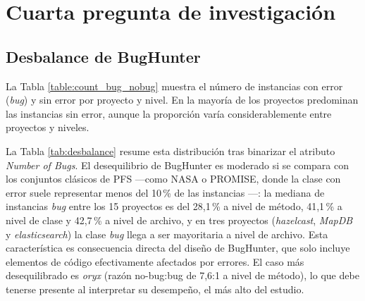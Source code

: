 \section{Cuarta pregunta de investigación}
\label{sec:RQ4}

\noindent{}
\vspace{12pt}

\subsection{Desbalance de BugHunter}

La Tabla \ref{table:count_bug_nobug} muestra el número de instancias con error (\textit{bug}) y sin error por proyecto y nivel. En la mayoría de los proyectos predominan las instancias sin error, aunque la proporción varía considerablemente entre proyectos y niveles.



La Tabla \ref{tab:desbalance} resume esta distribución tras binarizar el atributo \textit{Number of Bugs}. El desequilibrio de BugHunter es moderado si se compara con los conjuntos clásicos de PFS ---como NASA o PROMISE, donde la clase con error suele representar menos del 10\,\% de las instancias \cite{8494821}---: la mediana de instancias \textit{bug} entre los 15 proyectos es del 28,1\,\% a nivel de método, 41,1\,\% a nivel de clase y 42,7\,\% a nivel de archivo, y en tres proyectos (\textit{hazelcast}, \textit{MapDB} y \textit{elasticsearch}) la clase \textit{bug} llega a ser mayoritaria a nivel de archivo. Esta característica es consecuencia directa del diseño de BugHunter, que solo incluye elementos de código efectivamente afectados por errores. El caso más desequilibrado es \textit{oryx} (razón no-bug:bug de 7,6:1 a nivel de método), lo que debe tenerse presente al interpretar su desempeño, el más alto del estudio.

\begin{table}[H]
\centering
\caption{Proporción de instancias con error (\textit{bug}) por nivel de granularidad, sobre los 15 proyectos individuales}
\label{tab:desbalance}
\end{table}

